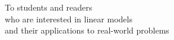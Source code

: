 \cleardoublepage
\thispagestyle{empty}
\begin{center}
\Large\itshape


To students and readers\\
who are interested in linear models\\
and their applications to real-world problems

 
\end{center}
